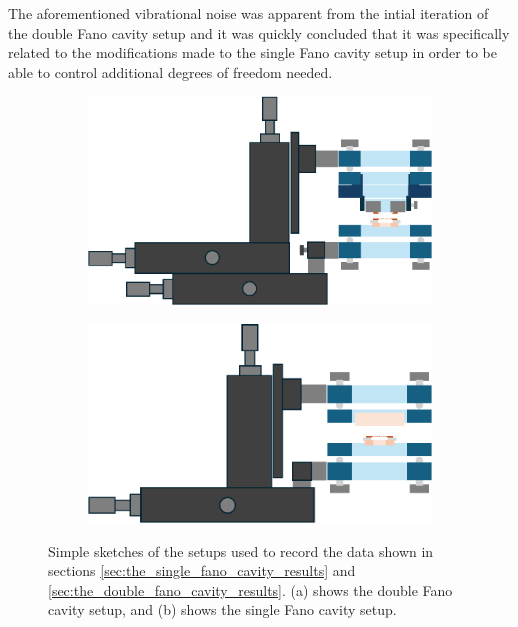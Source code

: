 The aforementioned vibrational noise was apparent from the intial iteration of the double Fano cavity setup and it was quickly concluded that it was specifically related to the modifications made to the single Fano cavity setup in order to be able to control additional degrees of freedom needed. 

\begin{figure}[h!]
    \centering
    \begin{subfigure}[b]{0.49\textwidth}
        \includegraphics[width=\textwidth]{figures/double_fano_sketch_discussion.pdf}
        \caption{}
        \label{fig:double_fano_discussion}
    \end{subfigure}
    \begin{subfigure}[b]{0.49\textwidth}
        \includegraphics[width=\textwidth]{figures/single_fano_sketch_discussion.pdf}
        \caption{}
        \label{fig:single_fano_discussion}
    \end{subfigure}
    \caption{Simple sketches of the setups used to record the data shown in sections \ref{sec:the_single_fano_cavity_results} and \ref{sec:the_double_fano_cavity_results}. (a) shows the double Fano cavity setup, and (b) shows the single Fano cavity setup.}
    \label{fig:single_vs_double_sketch}
\end{figure}

